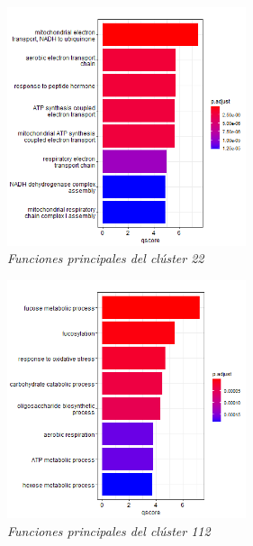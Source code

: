 \begin{figure}[h]
	\centering
	\includegraphics[width=70mm,scale=1.2]{figures/funcionesGO22.png}
	\caption{\textit{Funciones principales del clúster 22}}
	\label{22funciones}
\end{figure}

\begin{figure}[h]
	\centering
	\includegraphics[width=70mm,scale=1.2]{figures/funcionesG112.png}
	\caption{\textit{Funciones principales del clúster 112}}
	\label{112funciones}
\end{figure}